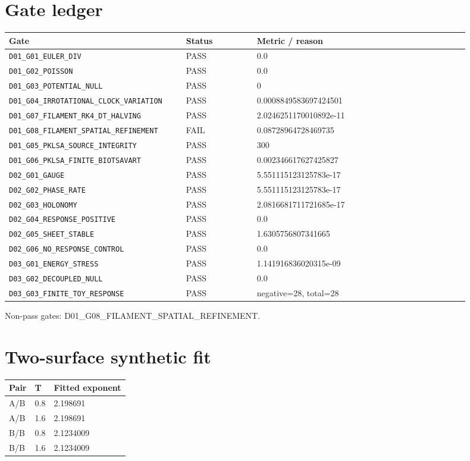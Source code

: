 \documentclass[10pt,a4paper]{article}
\begin{document}
\section{Gate ledger}
\footnotesize
\begin{longtable}{@{}p{0.34\linewidth}p{0.14\linewidth}p{0.42\linewidth}@{}}\toprule
Gate & Status & Metric / reason \\\midrule\endhead
\nolinkurl{D01_G01_EULER_DIV} & PASS & 0.0 \\
\nolinkurl{D01_G02_POISSON} & PASS & 0.0 \\
\nolinkurl{D01_G03_POTENTIAL_NULL} & PASS & 0 \\
\nolinkurl{D01_G04_IRROTATIONAL_CLOCK_VARIATION} & PASS & 0.0008849583697424501 \\
\nolinkurl{D01_G07_FILAMENT_RK4_DT_HALVING} & PASS & 2.0246251170010892e-11 \\
\nolinkurl{D01_G08_FILAMENT_SPATIAL_REFINEMENT} & FAIL & 0.08728964728469735 \\
\nolinkurl{D01_G05_PKLSA_SOURCE_INTEGRITY} & PASS & 300 \\
\nolinkurl{D01_G06_PKLSA_FINITE_BIOTSAVART} & PASS & 0.002346617627425827 \\
\nolinkurl{D02_G01_GAUGE} & PASS & 5.551115123125783e-17 \\
\nolinkurl{D02_G02_PHASE_RATE} & PASS & 5.551115123125783e-17 \\
\nolinkurl{D02_G03_HOLONOMY} & PASS & 2.0816681711721685e-17 \\
\nolinkurl{D02_G04_RESPONSE_POSITIVE} & PASS & 0.0 \\
\nolinkurl{D02_G05_SHEET_STABLE} & PASS & 1.6305756807341665 \\
\nolinkurl{D02_G06_NO_RESPONSE_CONTROL} & PASS & 0.0 \\
\nolinkurl{D03_G01_ENERGY_STRESS} & PASS & 1.141916836020315e-09 \\
\nolinkurl{D03_G02_DECOUPLED_NULL} & PASS & 0.0 \\
\nolinkurl{D03_G03_FINITE_TOY_RESPONSE} & PASS & negative=28, total=28 \\
\bottomrule\end{longtable}
\normalsize
Non-pass gates: D01\_G08\_FILAMENT\_SPATIAL\_REFINEMENT.
\section{Two-surface synthetic fit}
\begin{tabular}{@{}lll@{}}\toprule Pair & T & Fitted exponent \\\midrule
A/B & 0.8 & 2.198691 \\
A/B & 1.6 & 2.198691 \\
B/B & 0.8 & 2.1234009 \\
B/B & 1.6 & 2.1234009 \\
\bottomrule\end{tabular}
\end{document}
